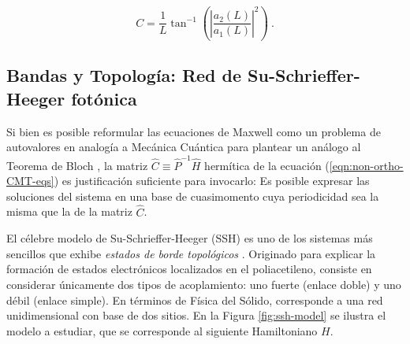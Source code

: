 \begin{equation}
	C = \frac{1}{L}\tan^{-1}\left( \left|\frac{a_2(L)}{a_1(L)}\right|^2 \right) \ . \label{eqn:coupling-simp}
\end{equation}

\subsection{Bandas y Topología: Red de Su-Schrieffer-Heeger fotónica}

Si bien es posible reformular las ecuaciones de Maxwell como un problema de autovalores en analogía a Mecánica Cuántica para plantear un análogo al Teorema de Bloch \cite{joannopoulos_photonic_2008}, la matriz $\hat{C}\equiv\hat{P}^{-1}\hat{H}$ hermítica de la ecuación (\ref{eqn:non-ortho-CMT-eqs}) es justificación suficiente para invocarlo: Es posible expresar las soluciones del sistema en una base de cuasimomento cuya periodicidad sea la misma que la de la matriz $\hat{C}$. 
%


El célebre modelo de Su-Schrieffer-Heeger (SSH) es uno de los sistemas más sencillos que exhibe \textit{estados de borde topológicos} \cite{ssh, ssh-photonic, topological-photonics}. Originado para explicar la formación de estados electrónicos localizados en el poliacetileno, consiste en considerar únicamente dos tipos de acoplamiento: uno fuerte (enlace doble) y uno débil (enlace simple). En términos de Física del Sólido, corresponde a una red unidimensional con base de dos sitios. En la Figura \ref{fig:ssh-model} se ilustra el modelo a estudiar, que se corresponde al siguiente Hamiltoniano $H$. 

